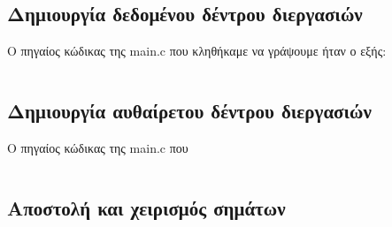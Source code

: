 \documentclass[a4paper,10pt]{article} \usepackage{anysize}
\begin{document}


\section*{} \setcounter{section}{1}
\subsection{Δημιουργία δεδομένου δέντρου διεργασιών} Ο πηγαίος κώδικας της main.c που
κληθήκαμε να γράψουμε ήταν ο εξής:

\inputminted[linenos]{c}{../stage_1.1/ask2-fork.c}

\subsection{Δημιουργία αυθαίρετου δέντρου διεργασιών} Ο πηγαίος κώδικας της main.c που

\inputminted[linenos]{c}{../stage_1.2/ask2-tree.c}

\subsection{Αποστολή και χειρισμός σημάτων}
\end{document}
